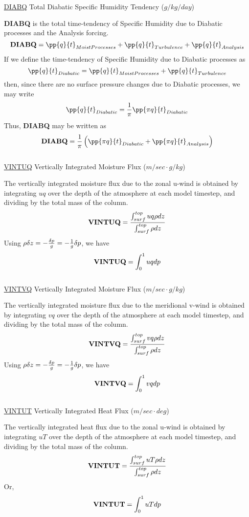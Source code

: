 \noindent
{ \underline {DIABQ} Total Diabatic Specific Humidity Tendency  ($g/kg/day$) }

\noindent
{\bf DIABQ} is the total time-tendency of Specific Humidity due to Diabatic processes
and the Analysis forcing.
\[
{\bf DIABQ} = \pp{q}{t}_{Moist Processes} + \pp{q}{t}_{Turbulence} + \pp{q}{t}_{Analysis} 
\]
If we define the time-tendency of Specific Humidity due to Diabatic processes as
\[
\pp{q}{t}_{Diabatic} = \pp{q}{t}_{Moist Processes} + \pp{q}{t}_{Turbulence}
\]
then, since there are no surface pressure changes due to Diabatic processes, we may write
\[
\pp{q}{t}_{Diabatic} = {1 \over \pi }\pp{\pi q}{t}_{Diabatic}
\]
Thus, {\bf DIABQ} may be written as
\[
{\bf DIABQ} = {1 \over \pi } \left( \pp{\pi q}{t}_{Diabatic} + \pp{\pi q}{t}_{Analysis} \right)
\]
\\

\noindent
{ \underline {VINTUQ} Vertically Integrated Moisture Flux ($m/sec \cdot g/kg$) }

\noindent
The vertically integrated moisture flux due to the zonal u-wind is obtained by integrating
$u q$ over the depth of the atmosphere at each model timestep, 
and dividing by the total mass of the column.
\[
{\bf VINTUQ} = \frac{ \int_{surf}^{top} u q \rho dz  } { \int_{surf}^{top} \rho dz  }
\]
Using $\rho \delta z = -{\delta p \over g} = - {1 \over g} \delta p$, we have 
\[
{\bf VINTUQ} = { \int_0^1 u q dp  }
\]
\\


\noindent
{ \underline {VINTVQ} Vertically Integrated Moisture Flux ($m/sec \cdot g/kg$) }

\noindent
The vertically integrated moisture flux due to the meridional v-wind is obtained by integrating
$v q$ over the depth of the atmosphere at each model timestep, 
and dividing by the total mass of the column.
\[
{\bf VINTVQ} = \frac{ \int_{surf}^{top} v q \rho dz  } { \int_{surf}^{top} \rho dz  }
\]
Using $\rho \delta z = -{\delta p \over g} = - {1 \over g} \delta p$, we have 
\[
{\bf VINTVQ} = { \int_0^1 v q dp  }
\]
\\


\noindent
{ \underline {VINTUT} Vertically Integrated Heat Flux ($m/sec \cdot deg$) }

\noindent
The vertically integrated heat flux due to the zonal u-wind is obtained by integrating
$u T$ over the depth of the atmosphere at each model timestep, 
and dividing by the total mass of the column.
\[
{\bf VINTUT} = \frac{ \int_{surf}^{top} u T \rho dz  } { \int_{surf}^{top} \rho dz  }
\]
Or,
\[
{\bf VINTUT} = { \int_0^1 u T dp  }
\]
\\

